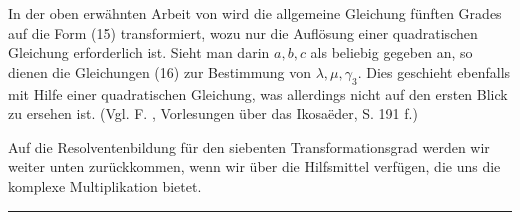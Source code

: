 
In der oben erwähnten Arbeit von  wird die allgemeine Gleichung fünften Grades auf die Form (15) transformiert, wozu nur die Auflösung einer quadratischen Gleichung erforderlich ist. Sieht man darin $a, b, c$ als beliebig gegeben an, so dienen die Gleichungen (16) zur Bestimmung von $\lambda, \mu, \gamma_3$. Dies geschieht ebenfalls mit Hilfe einer quadratischen Gleichung, was allerdings nicht auf den ersten Blick zu ersehen ist. (Vgl. F. , Vorlesungen über das Ikosa\"eder, S. 191 f.)

Auf die Resolventenbildung für den siebenten Transformationsgrad werden wir weiter unten zurückkommen, wenn wir über die Hilfsmittel verfügen, die uns die komplexe Multiplikation bietet.

\begin{center}\rule{0.2\linewidth}{0.4pt}\end{center}
